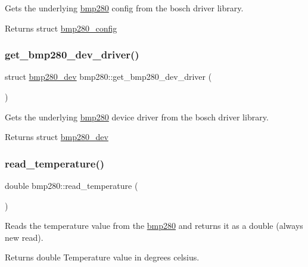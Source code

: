Gets the underlying \mbox{\hyperlink{classbmp280}{bmp280}} config from the bosch driver library. 

\begin{DoxyReturn}{Returns}
struct \mbox{\hyperlink{structbmp280__config}{bmp280\+\_\+config}} 
\end{DoxyReturn}
\mbox{\label{classbmp280_ac15f0e1c589daaf1778a0f1b86620efb}} 
\subsubsection{\texorpdfstring{get\_bmp280\_dev\_driver()}{get\_bmp280\_dev\_driver()}}
{\footnotesize\ttfamily struct \mbox{\hyperlink{structbmp280__dev}{bmp280\+\_\+dev}} bmp280\+::get\+\_\+bmp280\+\_\+dev\+\_\+driver (\begin{DoxyParamCaption}{ }\end{DoxyParamCaption})}



Gets the underlying \mbox{\hyperlink{classbmp280}{bmp280}} device driver from the bosch driver library. 

\begin{DoxyReturn}{Returns}
struct \mbox{\hyperlink{structbmp280__dev}{bmp280\+\_\+dev}} 
\end{DoxyReturn}
\mbox{\label{classbmp280_ae598eb1f714ba9a39896099ee157164f}} 
\subsubsection{\texorpdfstring{read\_temperature()}{read\_temperature()}}
{\footnotesize\ttfamily double bmp280\+::read\+\_\+temperature (\begin{DoxyParamCaption}{ }\end{DoxyParamCaption})}



Reads the temperature value from the \mbox{\hyperlink{classbmp280}{bmp280}} and returns it as a double (always new read). 

\begin{DoxyReturn}{Returns}
double Temperature value in degrees celsius. 
\end{DoxyReturn}
\mbox{\label{classbmp280_ac8426d09704b2d35088d760acb10e876}} 
